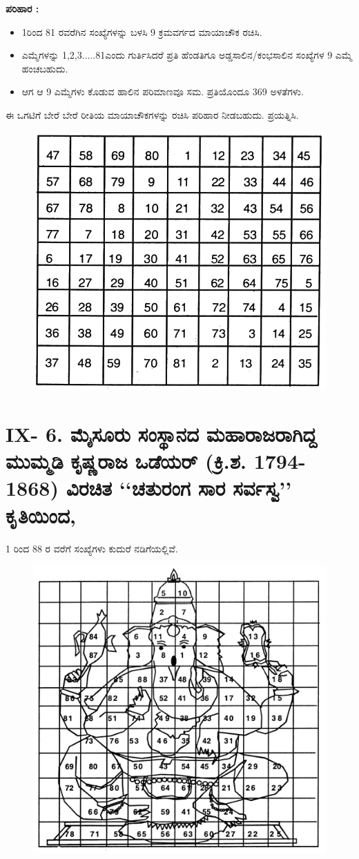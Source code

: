\smallskip
\textbf{ಪರಿಹಾರ :}
\begin{itemize}
	\item 1ರಿಂದ 81 ರವರೆಗಿನ ಸಂಖ್ಯೆಗಳನ್ನು ಬಳಸಿ 9 ಕ್ರಮವರ್ಗದ ಮಾಯಾಚೌಕ ರಚಿಸಿ.
	\item ಎಮ್ಮೆಗಳನ್ನು 1,2,3.....81ಎಂದು ಗುರ್ತಿಸಿದರೆ ಪ್ರತಿ ಹೆಂಡತಿಗೂ ಅಡ್ಡಸಾಲಿನ/\-ಕಂಭಸಾಲಿನ ಸಂಖ್ಯೆಗಳ 9 ಎಮ್ಮೆ ಹಂಚಬಹುದು.
	\item ಆಗ ಆ 9 ಎಮ್ಮೆಗಳು ಕೊಡುವ ಹಾಲಿನ ಪರಿಮಾಣವೂ ಸಮ. ಪ್ರತಿಯೊಂದೂ 369 ಅಳತೆಗಳು.
\end{itemize}
ಈ ಒಗಟಿಗೆ ಬೇರೆ ಬೇರೆ ರೀತಿಯ ಮಾಯಾಚೌಕಗಳನ್ನು ರಚಿಸಿ ಪರಿಹಾರ ನೀಡಬಹುದು. ಪ್ರಯತ್ನಿಸಿ.
\begin{figure}[H]
\includegraphics[scale=.8]{src/figures/chap8/fig8.12.jpg}
\end{figure}

\section*{IX- 6. ಮೈಸೂರು ಸಂಸ್ಥಾನದ ಮಹಾರಾಜರಾಗಿದ್ದ ಮುಮ್ಮಡಿ ಕೃಷ್ಣರಾಜ ಒಡೆಯರ್ (ಕ್ರಿ.ಶ. 1794-1868) ವಿರಚಿತ ‘‘ಚತುರಂಗ ಸಾರ ಸರ್ವಸ್ವ’’ ಕೃತಿಯಿಂದ,}

1 ರಿಂದ 88 ರ ವರೆಗೆ ಸಂಖ್ಯೆಗಳು ಕುದುರೆ ನಡಿಗೆಯಲ್ಲಿವೆ.
\begin{figure}[H]
\includegraphics[scale=.8]{src/figures/chap8/fig8.13.jpg}
\end{figure}
